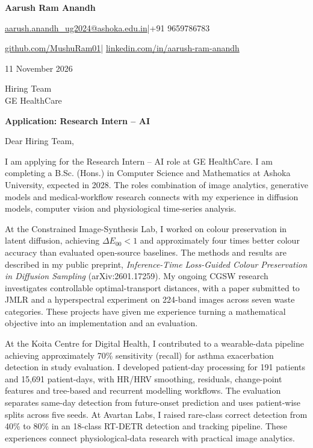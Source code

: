 \documentclass[11pt,a4paper]{article}
\begin{document}
{\LARGE\bfseries Aarush Ram Anandh}\par\vspace{4pt}
\href{mailto:aarush.anandh_ug2024@ashoka.edu.in}{aarush.anandh\_ug2024@ashoka.edu.in}\quad|\quad +91 9659786783\par\vspace{2pt}
\href{https://github.com/MushuRam01}{github.com/MushuRam01}\quad|\quad
\href{https://www.linkedin.com/in/aarush-ram-anandh/}{linkedin.com/in/aarush-ram-anandh}\par
\vspace{20pt}
11 November 2026\par\vspace{12pt}
Hiring Team\\
GE HealthCare\par\vspace{12pt}
\textbf{Application: Research Intern -- AI}\par\vspace{14pt}
Dear Hiring Team,\par\vspace{10pt}
I am applying for the Research Intern -- AI role at GE HealthCare. I am completing a B.Sc. (Hons.) in Computer Science and Mathematics at Ashoka University, expected in 2028. The role\textquotesingle s combination of image analytics, generative models and medical-workflow research connects with my experience in diffusion models, computer vision and physiological time-series analysis.\par\vspace{10pt}
At the Constrained Image-Synthesis Lab, I worked on colour preservation in latent diffusion, achieving $\Delta E_{00}<1$ and approximately four times better colour accuracy than evaluated open-source baselines. The methods and results are described in my public preprint, \textit{Inference-Time Loss-Guided Colour Preservation in Diffusion Sampling} (arXiv:2601.17259). My ongoing CGSW research investigates controllable optimal-transport distances, with a paper submitted to JMLR and a hyperspectral experiment on 224-band images across seven waste categories. These projects have given me experience turning a mathematical objective into an implementation and an evaluation.\par\vspace{10pt}
At the Koita Centre for Digital Health, I contributed to a wearable-data pipeline achieving approximately 70\% sensitivity (recall) for asthma exacerbation detection in study evaluation. I developed patient-day processing for 191 patients and 15,691 patient-days, with HR/HRV smoothing, residuals, change-point features and tree-based and recurrent modelling workflows. The evaluation separates same-day detection from future-onset prediction and uses patient-wise splits across five seeds. At Avartan Labs, I raised rare-class correct detection from 40\% to 80\% in an 18-class RT-DETR detection and tracking pipeline. These experiences connect physiological-data research with practical image analytics.\par\vspace{10pt}
\end{document}
